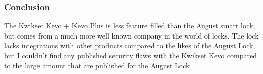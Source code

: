 
\subsubsection*{Conclusion}
The Kwikset Kevo + Kevo Plus is less feature filled than the August smart lock, but comes from a much more well known company in the world of locks. The lock lacks integrations with other products compared to the likes of the August Lock, but I couldn't find any published security flaws with the Kwikset Kevo compared to the large amount that are published for the August Lock.

